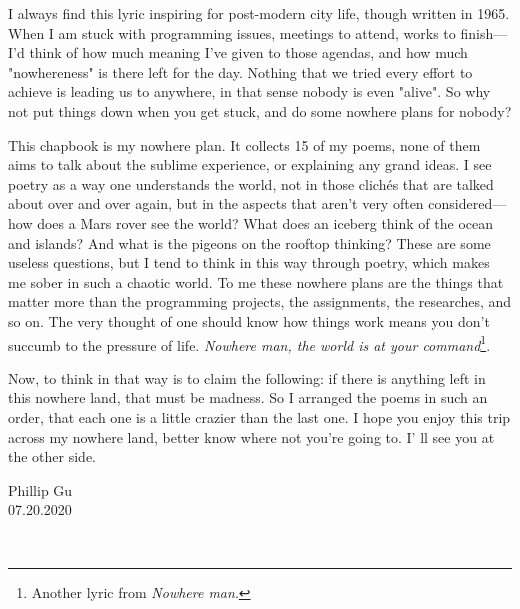 \documentclass{book}
\begin{document}
\par{} I always find this lyric inspiring for post-modern city life, though written in 1965. When I am stuck with programming issues, meetings to attend, works to finish---I'd think of how much meaning I've given to those agendas, and how much "nowhereness" is there left for the day. Nothing that we tried every effort to achieve is leading us to anywhere, in that sense nobody is even "alive". So why not put things down when you get stuck, and do some nowhere plans for nobody?
\par{} This chapbook is my nowhere plan. It collects 15 of my poems, none of them aims to talk about the sublime experience, or explaining any grand ideas. I see poetry as a way one understands the world, not in those clichés that are talked about over and over again, but in the aspects that aren't very often considered---how does a Mars rover see the world? What does an iceberg think of the ocean and islands? And what is the pigeons on the rooftop thinking? These are some useless questions, but I tend to think in this way through poetry, which makes me sober in such a chaotic world. To me these nowhere plans are the things that matter more than the programming projects, the assignments, the researches, and so on. The very thought of one should know how things work means you don't succumb to the pressure of life. \textit{Nowhere man, the world is at your command}\footnote{Another lyric from \textit{Nowhere man}.}.
\par{} Now, to think in that way is to claim the following: if there is anything left in this nowhere land, that must be madness. So I arranged the poems in such an order, that each one is a little crazier than the last one. I hope you enjoy this trip across my nowhere land, better know where not you're going to. I' ll see you at the other side.
\begin{flushright}
    Phillip Gu\\
    07.20.2020
\end{flushright}
\newpage
\tableofcontents
\newpage
\renewcommand{\poemtitlefont}{\normalfont\large\itshape\centering}
\poemtitle{\textcolor[RGB]{165,15,15}{Opportunity's mission}}
\hspace*{\fill} \\
\settowidth{\versewidth}{back in Mojave, at dusk. If weather permits a stretch}
\end{document}
